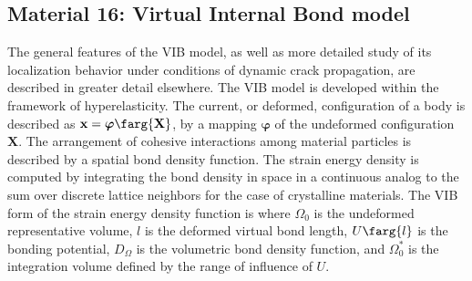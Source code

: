 \subsection{Material 16: Virtual Internal Bond model}
\label{sect.mat.VIB}
The general features of the VIB model,
as well as more detailed study of its localization 
behavior under conditions of
dynamic crack propagation, are described
in greater detail 
elsewhere\cite{Gao1998,Klein1998,Klein1999,Klein2000}.
The VIB model is developed within the framework of hyperelasticity.
The current, or deformed, configuration of a body is described
as $\mathbf{x} = \boldsymbol{\varphi} \farg{\mathbf{X}}$, by
a mapping $\boldsymbol{\varphi}$ of the undeformed configuration
$\mathbf{X}$.
The arrangement of cohesive interactions among material particles 
is described by a spatial bond density function. The strain energy 
density is computed 
by integrating the bond density in space in a continuous analog to the sum
over discrete lattice neighbors for the case of crystalline materials. 
The VIB form of the
strain energy density function is
where $\Omega_{0}$ is the undeformed representative volume, 
$l$ is the deformed virtual bond length, $U \farg{l}$ is 
the bonding potential, $D_{\Omega}$ is the volumetric bond density function,
and $\Omega_0^{*}$ is the integration volume defined by the range of influence
of $U$.


